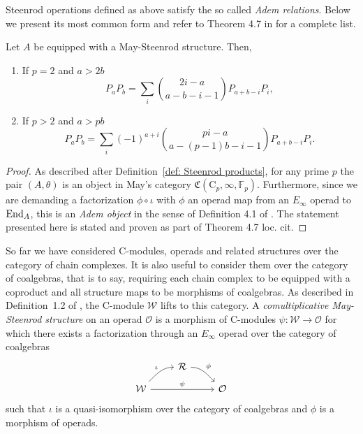 Steenrod operations defined as above satisfy the so called \textit{Adem relations}.
Below we present its most common form and refer to Theorem 4.7 in \cite{may70generalapproach} for a complete list.

\begin{lemma}
	Let $A$ be equipped with a May-Steenrod structure.
	Then,
	\begin{enumerate}
		\item If $p = 2$ and $a > 2b$
		\begin{equation*}
		P_{a}P_{b} = \sum_i {2i-a \choose a-b-i-1} P_{a+b-i}P_i,
		\end{equation*}
		\item If $p > 2$ and $a > pb$
		\begin{equation*}
		P_{a}P_{b} = \sum_i (-1)^{a+i}{pi-a \choose a-(p-1)b-i-1} P_{a+b-i}P_i.
		\end{equation*}
	\end{enumerate}		
\end{lemma}

\begin{proof}
	As described after Definition~\ref{def: Steenrod products}, for any prime $p$ the pair $(A, \theta)$ is an object in May's category $\mathfrak{C}(\mathrm C_p, \infty, \mathbb{F}_p)$.
	Furthermore, since we are demanding a factorization $\phi \circ \iota$ with $\phi$ an operad map from an $E_\infty$ operad to $\mathrm{End}_A$, this is an \textit{Adem object} in the sense of Definition 4.1 of \cite{may70generalapproach}.
	The statement presented here is stated and proven as part of Theorem 4.7 loc. cit.
\end{proof}

So far we have considered $\mathrm{C}$-modules, operads and related structures over the category of chain complexes.
It is also useful to consider them over the category of coalgebras, that is to say, requiring each chain complex to be equipped with a coproduct and all structure maps to be morphisms of coalgebras.	
As described in Definition~1.2 of \cite{may70generalapproach}, the $\mathrm{C}$-module $\mathcal W$ lifts to this category.
A \textit{comultiplicative May-Steenrod structure} on an operad $\mathcal O$ is a morphism of $\mathrm{C}$-modules $\psi \colon \mathcal W \to \mathcal O$ for which there exists a factorization through an $E_\infty$ operad over the category of coalgebras
\begin{equation*}
\begin{tikzcd}[column sep = normal, row sep = small]
& \mathcal R \arrow[dr, "\phi", out=0] & \\
\mathcal W \arrow[ur, "\iota", in=180] \arrow[rr, "\psi"] & & \mathcal O
\end{tikzcd}
\end{equation*}
such that $\iota$ is a quasi-isomorphism over the category of coalgebras and $\phi$ is a morphism of operads.

